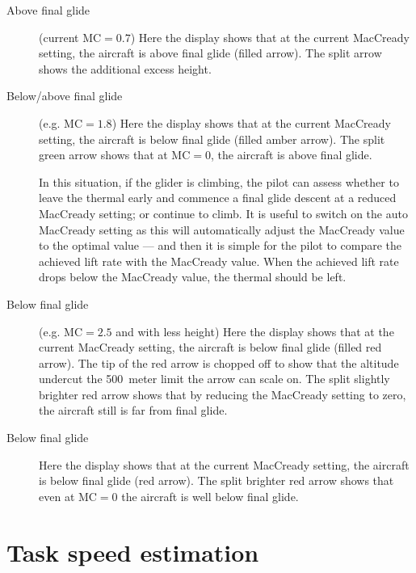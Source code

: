 \begin{description}
\item[Above final glide] (current MC$=0.7$)
  Here the display shows that at the current MacCready setting, the aircraft
  is above final glide (filled arrow).  The split arrow shows the additional
  excess height.

\item[Below/above final glide] (e.g. MC$=1.8$)
  Here the display shows that at the current MacCready setting, the aircraft
  is below final glide (filled amber arrow).  The split green arrow
  shows that at MC$=0$, the aircraft is above final glide.

  In this situation, if the glider is climbing, the pilot can assess
  whether to leave the thermal early and commence a final glide
  descent at a reduced MacCready setting; or continue to climb.  It is
  useful to switch on the auto MacCready setting as this will
  automatically adjust the MacCready value to the optimal value ---
  and then it is simple for the pilot to compare the achieved lift
  rate with the MacCready value.  When the achieved lift rate drops
  below the MacCready value, the thermal should be left.

\item[Below final glide] (e.g. MC$=2.5$ and with less height)
  Here the display shows that at the current MacCready setting, the aircraft
  is below final glide (filled red arrow).  The tip of the red arrow is chopped off
  to show that the altitude undercut the 500~meter limit the arrow can scale on.
  The split slightly brighter red arrow shows that by reducing the MacCready 
  setting to zero, the aircraft still is far from final glide.

\item[Below final glide] 
  Here the display shows that at the current MacCready setting, the aircraft
  is below final glide (red arrow).  The split brighter red arrow
  shows that even at MC$=0$ the aircraft is well below final glide.
\end{description}


\section{Task speed estimation}\label{sec:task-speed-estim}

